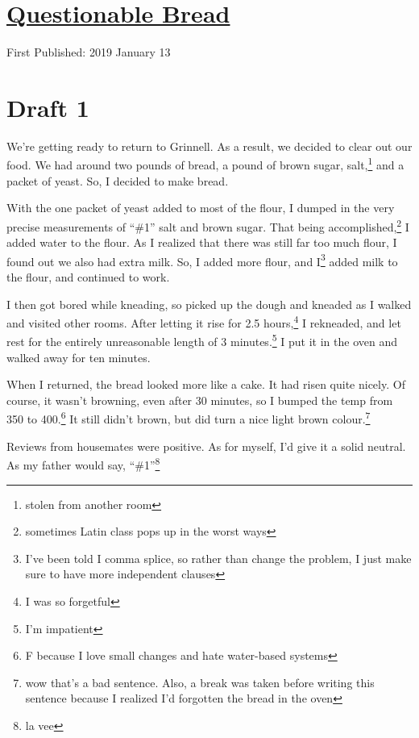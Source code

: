 \documentclass[12pt]{article}[titlepage]
\newcommand{\say}[1]{``\#1''}
\newcommand{\1}{\={a}}
\newcommand{\2}{\={e}}
\newcommand{\3}{\={\i}}
\newcommand{\4}{\=o}
\newcommand{\5}{\=u}
\newcommand{\6}{\={A}}
\renewcommand{\,}{\textsuperscript{,}}
\begin{document}
\doublespacing
\section{\href{questionable-bread.html}{Questionable Bread}}
First Published: 2019 January 13
\section{Draft 1}
We're getting ready to return to Grinnell.
As a result, we decided to clear out our food.
We had around two pounds of bread, a pound of brown sugar, salt,\footnote{stolen from another room} and a packet of yeast.
So, I decided to make bread.

With the one packet of yeast added to most of the flour, I dumped in the very precise measurements of \say{some} salt and brown sugar.
That being accomplished,\footnote{sometimes Latin class pops up in the worst ways} I added water to the flour.
As I realized that there was still far too much flour, I found out we also had extra milk.
So, I added more flour, and I\footnote{I've been told I comma splice, so rather than change the problem, I just make sure to have more independent clauses} added milk to the flour, and continued to work.

I then got bored while kneading, so picked up the dough and kneaded as I walked and visited other rooms.
After letting it rise for 2.5 hours,\footnote{I was so forgetful} I rekneaded, and let rest for the entirely unreasonable length of 3 minutes.\footnote{I'm impatient}
I put it in the oven and walked away for ten minutes.

When I returned, the bread looked more like a cake.
It had risen quite nicely.
Of course, it wasn't browning, even after 30 minutes, so I bumped the temp from 350 to 400.\footnote{F because I love small changes and hate water-based systems}
It still didn't brown, but did turn a nice light brown colour.\footnote{wow that's a bad sentence. Also, a break was taken before writing this sentence because I realized I'd forgotten the bread in the oven}

Reviews from housemates were positive.
As for myself, I'd give it a solid neutral.
As my father would say, \say{c'est la vie.}\footnote{la vee}
\end{document}
